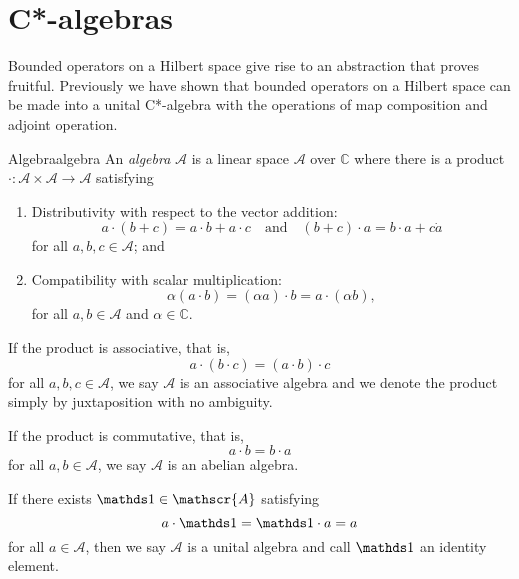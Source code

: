 \chapter{C*-algebras}
Bounded operators on a Hilbert space give rise to an abstraction that proves fruitful. Previously we have shown that bounded operators on a Hilbert space can be made into a unital C*-algebra with the operations of map composition and adjoint operation.
\begin{definition}{Algebra}{algebra}
    An \emph{algebra} \(\mathscr{A}\) is a linear space \(\mathscr{A}\) over \(\mathbb{C}\) where there is a product \(\cdot : \mathscr{A} \times \mathscr{A} \to \mathscr{A}\) satisfying
\begin{enumerate}[label=(\alph*)]
    \item Distributivity with respect to the vector addition:
        \begin{equation*}
            a\cdot(b + c) = a\cdot b + a\cdot c
            \quad\text{and}\quad
            (b + c) \cdot a = b \cdot a + c \dot a
        \end{equation*}
        for all \(a, b, c \in \mathscr{A}\); and
    \item Compatibility with scalar multiplication:
        \begin{equation*}
            \alpha(a \cdot b) = (\alpha a)\cdot b = a \cdot (\alpha b),
        \end{equation*}
        for all \(a, b \in \mathscr{A}\) and \(\alpha \in \mathbb{C}\).
\end{enumerate}
If the product is associative, that is,
\begin{equation*}
    a \cdot (b \cdot c) = (a \cdot b) \cdot c
\end{equation*}
for all \(a, b, c \in \mathscr{A}\), we say \(\mathscr{A}\) is an associative algebra and we denote the product simply by juxtaposition with no ambiguity.

If the product is commutative, that is,
\begin{equation*}
    a \cdot b = b \cdot a
\end{equation*}
for all \(a, b \in \mathscr{A}\), we say \(\mathscr{A}\) is an abelian algebra.

If there exists \(\unity \in \mathscr{A}\) satisfying
\begin{equation*}
    a \cdot \unity = \unity \cdot a = a
\end{equation*}
for all \(a \in \mathscr{A}\), then we say \(\mathscr{A}\) is a unital algebra and call \(\unity\) an identity element.
\end{definition}

